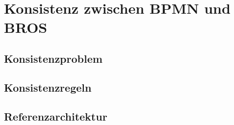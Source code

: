 \chapter{Konsistenz zwischen BPMN und BROS}

\section{Konsistenzproblem}

\section{Konsistenzregeln}

\section{Referenzarchitektur}